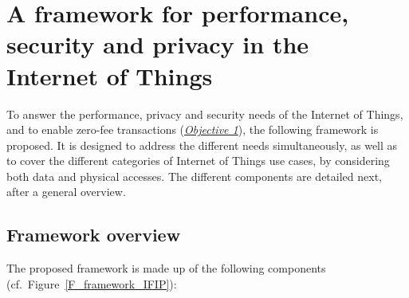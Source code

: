 \section{A framework for performance, security and privacy in the Internet of Things}
\label{S_framework}
To answer the performance, privacy and security needs of the Internet of Things, and to enable zero-fee transactions (\hyperref[obj:1]{\emph{Objective 1}}),
the following framework is proposed. It is designed to address the different needs simultaneously, as well as to cover the different 
categories of Internet of Things use cases, by considering both data and physical accesses. The different components are detailed next, after a general overview.

 \subsection{Framework overview}

 
 The proposed framework is made up of the following components (cf.~Figure~\ref{F_framework_IFIP}):

